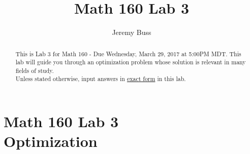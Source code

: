 \documentclass[handout,nooutcomes]{ximera}
\title{Math 160 Lab 3}
\author{Jeremy Buss} %
\begin{document}
\section{Math 160 Lab 3 \\ Optimization}

\begin{abstract}
This is Lab 3 for Math 160 - Due Wednesday, March 29, 2017 at 5:00PM MDT.
This lab will guide you through an optimization problem whose solution is relevant in many fields of study.\\

Unless stated otherwise, input answers in \underline{exact form} in this lab.
\end{abstract}



\maketitle
\end{document}
